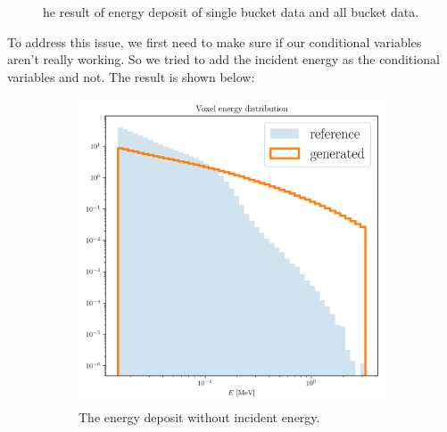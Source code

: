 \begin{figure}[htbp]
    \caption{he result of energy deposit of single bucket data and all bucket data.}
    \label{fig:energy_voxel}
\end{figure}

To address this issue, we first need to make sure if our conditional variables aren't really working. So we tried to add the incident energy as the conditional variables and not. The result is shown below:

\begin{figure}[htbp]
    \centering
    \begin{subfigure}[b]{0.45\textwidth} %
        \includegraphics[width=\textwidth]{Figures/energy_deposit_without_incident.png}
        \caption{The energy deposit without incident energy.}
        \label{fig:without_incident}
    \end{subfigure}
    \hfill %
    \begin{subfigure}[b]{0.45\textwidth}

\end{subfigure}
\end{figure}
